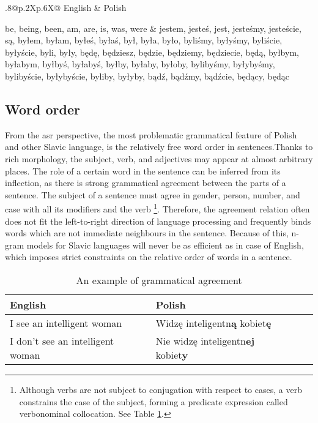 \begin{table}[!ht]
  \caption{The verb \textit{być} (to be) in English and its inflected forms in Polish}
    \label{table:verb}
    \centering
    \begin{tabularx}{.8\linewidth}{@{}p{.2\textwidth}Xp{.6\textwidth}X@{}}
      English & Polish\\
      \hline
      \raggedright be, being, been, am, are, is, was, were & jestem, jesteś, jest, jesteśmy, jesteście, są, byłem, byłam, byłeś, byłaś, był, była, było, byliśmy, byłyśmy, byliście, byłyście, byli, były, będę, będziesz, będzie, będziemy, będziecie, będą, byłbym, byłabym, byłbyś, byłabyś, byłby, byłaby, byłoby, bylibyśmy, byłybyśmy, bylibyście, byłybyście, byliby, byłyby, bądź, bądźmy, bądźcie, będący, będąc\\
    \end{tabularx}
\end{table}

\FloatBarrier
\subsection{Word order}
From the \gls{asr} perspective, the most problematic grammatical feature of Polish and other Slavic language, is the relatively free word order in sentences.Thanks to rich morphology, the subject, verb, and adjectives may appear at almost arbitrary places. The role of a certain word in the sentence can be inferred from its inflection, as there is strong grammatical agreement between the parts of a sentence. The subject of a sentence must agree in gender, person, number, and case with all its modifiers and the verb \footnote{Although verbs are not subject to conjugation with respect to cases, a verb constrains the case of the subject, forming a predicate expression called verbonominal collocation\cite{vetulani2007towards}. See Table \ref{table:agreement}.}. Therefore, the agreement relation often does not fit the left-to-right direction of language processing and frequently binds words which are not immediate neighbours in the sentence. Because of this, n-gram models for Slavic languages will never be as efficient as in case of English, which imposes strict constraints on the relative order of words in a sentence.

\begin{table}[!ht]
  \caption{An example of grammatical agreement}
    \label{table:agreement}
    \centering
    \begin{tabularx}{.8\linewidth}{@{}p{}Xp{}X@{}}
      English & Polish\\
      \hline
      I see an intelligent woman & Widzę inteligentn\textbf{ą} kobiet\textbf{ę}\\
      I don't see an intelligent woman & Nie widzę inteligentn\textbf{ej} kobiet\textbf{y}\\
    \end{tabularx}
\end{table}

